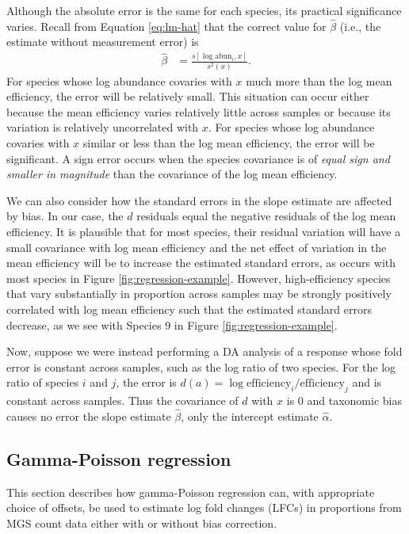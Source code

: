 \documentclass[
]{article}
\begin{document}
Although the absolute error is the same for each species, its practical significance varies.
Recall from Equation \eqref{eq:lm-hat} that the correct value for \(\hat \beta\) (i.e., the estimate without measurement error) is
\begin{align}
  \hat \beta &= \frac{s[\log \text{abun}_i, x]}{s^2(x)}.
\end{align}
For species whose log abundance covaries with \(x\) much more than the log mean efficiency, the error will be relatively small.
This situation can occur either because the mean efficiency varies relatively little across samples or because its variation is relatively uncorrelated with \(x\).
For species whose log abundance covaries with \(x\) similar or less than the log mean efficiency, the error will be significant.
A sign error occurs when the species covariance is of \emph{equal sign and smaller in magnitude} than the covariance of the log mean efficiency.

We can also consider how the standard errors in the slope estimate are affected by bias.
In our case, the \(d\) residuals equal the negative residuals of the log mean efficiency.
It is plausible that for most species, their residual variation will have a small covariance with log mean efficiency and the net effect of variation in the mean efficiency will be to increase the estimated standard errors, as occurs with most species in Figure \ref{fig:regression-example}.
However, high-efficiency species that vary substantially in proportion across samples may be strongly positively correlated with log mean efficiency such that the estimated standard errors decrease, as we see with Species 9 in Figure \ref{fig:regression-example}.

Now, suppose we were instead performing a DA analysis of a response whose fold error is constant across samples, such as the log ratio of two species.
For the log ratio of species \(i\) and \(j\), the error is \(d(a) = \log \text{efficiency}_i / \text{efficiency}_j\) and is constant across samples.
Thus the covariance of \(d\) with \(x\) is 0 and taxonomic bias causes no error the slope estimate \(\hat \beta\), only the intercept estimate \(\hat \alpha\).

\hypertarget{gamma-poisson-regression}{%
\subsection{Gamma-Poisson regression}\label{gamma-poisson-regression}}

This section describes how gamma-Poisson regression can, with appropriate choice of offsets, be used to estimate log fold changes (LFCs) in proportions from MGS count data either with or without bias correction.
\end{document}
